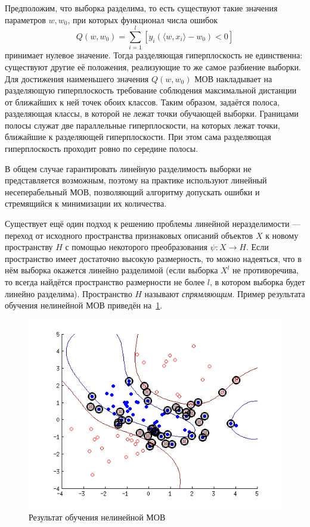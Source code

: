 Предположим, что выборка разделима, то есть существуют такие значения параметров $ w, w_0 $, при которых функционал числа ошибок
\begin{equation*}
Q(w, w_0) = \sum_{i = 1}^l [y_i(\langle w, x_i \rangle - w_0) < 0]
\end{equation*}
принимает нулевое значение. Тогда разделяющая гиперплоскость не единственна: существуют другие её положения, реализующие то же самое разбиение выборки. Для достижения наименьшего значения $ Q(w, w_0) $ МОВ накладывает на разделяющую гиперплоскость требование соблюдения максимальной дистанции от ближайших к ней точек обоих классов. Таким образом, задаётся полоса, разделяющая классы, в которой не лежат точки обучающей выборки. Границами полосы служат две параллельные гиперплоскости, на которых лежат точки, ближайшие к разделяющей гиперплоскости. При этом сама разделяющая гиперплоскость проходит ровно по середине полосы.

В общем случае гарантировать линейную разделимость выборки не представляется возможным, поэтому на практике используют линейный несеперабельный МОВ, позволяющий алгоритму допускать ошибки и стремящийся к минимизации их количества.

Существует ещё один подход к решению проблемы линейной неразделимости --- переход от исходного пространства признаковых описаний объектов $ X $ к новому пространству $ H $ с помощью некоторого преобразования $ \psi: X \to H $. Если пространство имеет достаточно высокую размерность, то можно надеяться, что в нём выборка окажется линейно разделимой (если выборка $ X^l $ не противоречива, то всегда найдётся пространство размерности не более $ l $, в котором выборка будет линейно разделима). Пространство $ H $ называют \textit{спрямляющим}. Пример результата обучения нелинейной МОВ приведён на~\ref{fig:NonLinSVM}.

\begin{figure}[h]
     \centering
     \includegraphics[width=1\textwidth]{include/graphics/nonlin_svm}
     \caption{Результат обучения нелинейной МОВ}
     \label{fig:NonLinSVM}
\end{figure}

